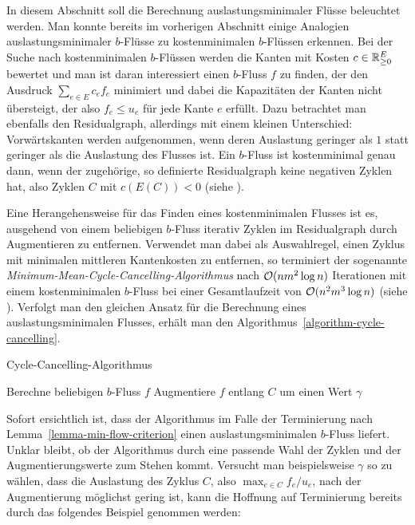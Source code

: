 In diesem Abschnitt soll die Berechnung auslastungsminimaler Flüsse beleuchtet werden.
Man konnte bereits im vorherigen Abschnitt einige Analogien auslastungsminimaler $b$-Flüsse zu kostenminimalen $b$-Flüssen erkennen.
Bei der Suche nach kostenminimalen $b$-Flüssen werden die Kanten mit Kosten $c\in\mathbb{R}_{\geq 0}^E$ bewertet und man ist daran interessiert einen $b$-Fluss $f$ zu finden, der den Ausdruck $\sum_{e \in E} c_e f_e$ minimiert und dabei die Kapazitäten der Kanten nicht übersteigt, der also $f_e \leq u_e$ für jede Kante $e$ erfüllt.
Dazu betrachtet man ebenfalls den Residualgraph, allerdings mit einem kleinen Unterschied: Vorwärtskanten werden aufgenommen, wenn deren Auslastung geringer als $1$ statt geringer als die Auslastung des Flusses ist.
Ein $b$-Fluss ist kostenminimal genau dann, wenn der zugehörige, so definierte Residualgraph keine negativen Zyklen hat, also Zyklen $C$ mit $c(E(C)) < 0$ (siehe \cite[Satz 9.7]{Korte2012}).

Eine Herangehensweise für das Finden eines kostenminimalen Flusses ist es, ausgehend von einem beliebigen $b$-Fluss iterativ Zyklen im Residualgraph durch Augmentieren zu entfernen.
Verwendet man dabei als Auswahlregel, einen Zyklus mit minimalen mittleren Kantenkosten zu entfernen, so terminiert der sogenannte \emph{Minimum-Mean-Cycle-Cancelling-Algorithmus} nach $\mathcal{O}(nm^2\log n)$ Iterationen mit einem kostenminimalen $b$-Fluss bei einer Gesamtlaufzeit von $\mathcal{O}(n^2m^3 \log n)$ (siehe \cite[Theoreme~3.9, 3.10]{Goldberg1989}).
Verfolgt man den gleichen Ansatz für die Berechnung eines auslastungsminimalen Flusses, erhält man den Algorithmus~\ref{algorithm-cycle-cancelling}.
\begin{algorithm}
	\caption{Cycle-Cancelling-Algorithmus}
	\label{algorithm-cycle-cancelling}
	\begin{algorithmic}[1]
		\State Berechne beliebigen $b$-Fluss $f$
			\State Augmentiere $f$ entlang $C$ um einen Wert $\gamma$
		\EndWhile
		\EndProcedure
	\end{algorithmic}
\end{algorithm}

Sofort ersichtlich ist, dass der Algorithmus im Falle der Terminierung nach Lemma~\ref{lemma-min-flow-criterion} einen auslastungsminimalen $b$-Fluss liefert.
Unklar bleibt, ob der Algorithmus durch eine passende Wahl der Zyklen und der Augmentierungswerte zum Stehen kommt.
Versucht man beispielsweise $\gamma$ so zu wählen, dass die Auslastung des Zyklus $C$, also $\max_{e\in C} f_e / u_e$, nach der Augmentierung möglichst gering ist, kann die Hoffnung auf Terminierung bereits durch das folgendes Beispiel genommen werden:

